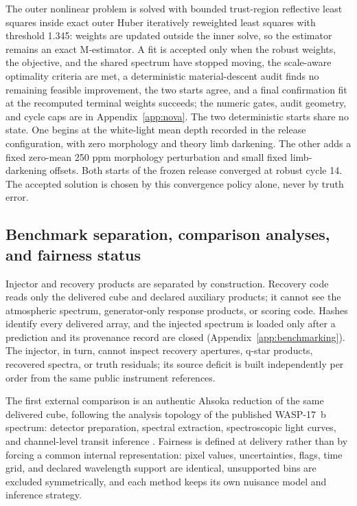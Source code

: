 The outer nonlinear problem is solved with bounded trust-region reflective
least squares \citep{BranchColemanLi1999} inside exact outer Huber
iteratively reweighted least squares \citep{Huber1964} with threshold
1.345: weights are updated outside the inner solve, so the estimator
remains an exact M-estimator. A fit is accepted only when the robust
weights, the objective, and the shared spectrum have stopped moving, the
scale-aware optimality criteria are met, a deterministic material-descent
audit finds no remaining feasible improvement, the two starts agree, and a
final confirmation fit at the recomputed terminal weights succeeds; the
numeric gates, audit geometry, and cycle caps are in
Appendix~\ref{app:nova}. The two deterministic starts share no state. One begins at the
white-light mean depth recorded in the release configuration, with zero
morphology and theory limb darkening. The other adds a fixed zero-mean
250 ppm morphology perturbation and small fixed limb-darkening offsets. Both starts of the
frozen release converged at robust cycle 14. The accepted solution is
chosen by this convergence policy alone, never by truth error.

\subsection{Benchmark separation, comparison analyses, and fairness status}


Injector and recovery products are separated by construction. Recovery
code reads only the delivered cube and declared auxiliary products; it
cannot see the atmospheric spectrum, generator-only response products, or
scoring code. Hashes identify every delivered array, and the injected
spectrum is loaded only after a prediction and its provenance record are
closed (Appendix~\ref{app:benchmarking}). The injector, in turn, cannot
inspect recovery apertures, q-star products, recovered spectra, or truth
residuals; its source deficit is built independently per order from the
same public instrument references.

The first external comparison is an authentic Ahsoka reduction of the same
delivered cube, following the analysis topology of the published
WASP-17~b spectrum: detector preparation, spectral extraction,
spectroscopic light curves, and channel-level transit inference
\citep{LouieEtAl2025}. Fairness is defined at delivery rather than by
forcing a common internal representation: pixel values, uncertainties,
flags, time grid, and declared wavelength support are identical,
unsupported bins are excluded symmetrically, and each method keeps its own
nuisance model and inference strategy.

